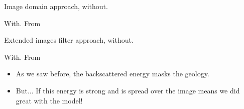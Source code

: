 \begin{frame}
Image domain approach, without.
\end{frame}

\begin{frame}
With. From ~\cite{guitton:S19}
\end{frame}


\begin{frame}
Extended images filter approach, without.
\end{frame}

\begin{frame}
With. From ~\cite{kaelin:3125}
\end{frame}


\begin{frame}
	\begin{itemize}
		\item As we saw before, the backscattered energy masks the geology.
		\item But... If this energy is strong and is spread over the image means we did great with the model!
	\end{itemize}
\end{frame}




%

\begin{frame}  \end{frame}



